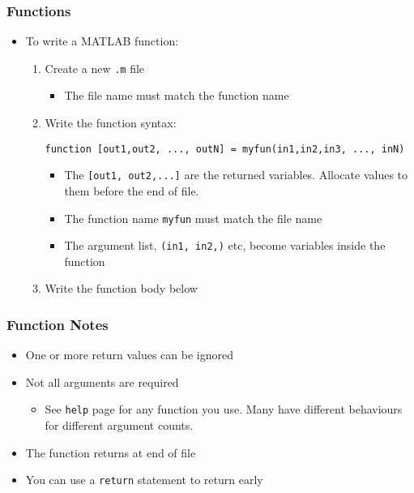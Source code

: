 \documentclass[14pt]{beamer}
\begin{document}
\begin{frame}[fragile]
\frametitle{Functions}

\begin{itemize}
\item To write a MATLAB function:
	\begin{enumerate}
		\item Create a new \texttt{.m} file
			\begin{itemize}
				\item The file name must match the function name
			\end{itemize}
		\item Write the function syntax:
		\begin{lstlisting}[style=pseudo]
function [out1,out2, ..., outN] = myfun(in1,in2,in3, ..., inN)
\end{lstlisting}
			\begin{itemize}
				\item The \texttt{[out1, out2,...]} are the returned variables. Allocate values to them before the end of file.
				\item The function name \texttt{myfun} must match the file name
				\item The argument list, \texttt{(in1, in2,)} etc, become variables inside the function
			\end{itemize}
		\item Write the function body below
	\end{enumerate}
\end{itemize}
\end{frame}

\begin{frame}
\frametitle{Function Notes}
\begin{itemize}
\item One or more return values can be ignored
\item Not all arguments are required
	\begin{itemize}
		\item See \texttt{help} page for any function you use. Many have different behaviours for different argument counts.
	\end{itemize}
\item The function returns at end of file
\item You can use a \texttt{return} statement to return early
\end{itemize}
\end{frame}
\end{document}
